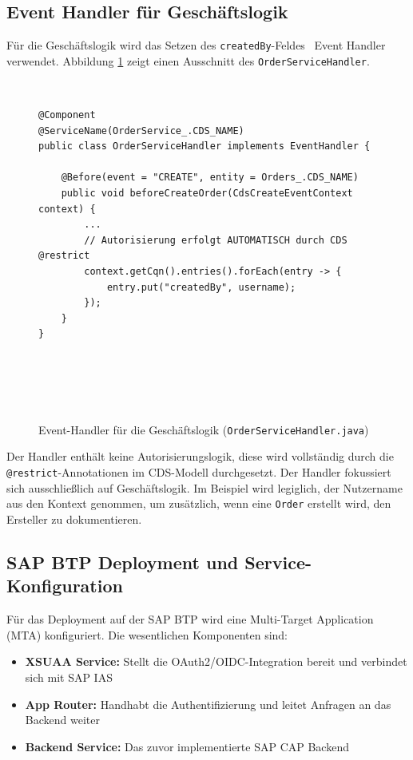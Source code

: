 \subsection{Event Handler für Geschäftslogik}

Für die Geschäftslogik wird das Setzen des \texttt{createdBy}-Feldes  Event Handler verwendet. Abbildung \ref{fig:cap_handler} zeigt einen Ausschnitt des \texttt{OrderServiceHandler}.

\begin{figure}[h]
    \begin{verbatim}
@Component
@ServiceName(OrderService_.CDS_NAME)
public class OrderServiceHandler implements EventHandler {

    @Before(event = "CREATE", entity = Orders_.CDS_NAME)
    public void beforeCreateOrder(CdsCreateEventContext context) {
        ...
        // Autorisierung erfolgt AUTOMATISCH durch CDS @restrict
        context.getCqn().entries().forEach(entry -> {
            entry.put("createdBy", username);
        });
    }
}
    \end{verbatim}
    \caption{Event-Handler für die Geschäftslogik (\texttt{OrderServiceHandler.java})}
    \label{fig:cap_handler}
\end{figure}

Der Handler enthält keine Autorisierungslogik, diese wird vollständig durch die \texttt{@restrict}-Annotationen im \ac{CDS}-Modell durchgesetzt. Der Handler fokussiert sich ausschließlich auf Geschäftslogik. Im Beispiel wird legiglich, der Nutzername aus den Kontext genommen, um zusätzlich, wenn eine \texttt{Order} erstellt wird, den Ersteller zu dokumentieren.

\subsection{SAP BTP Deployment und Service-Konfiguration}

Für das Deployment auf der \ac{SAP BTP} wird eine Multi-Target Application (MTA) konfiguriert. Die wesentlichen Komponenten sind:

\begin{itemize}
    \item \textbf{XSUAA Service:} Stellt die OAuth2/OIDC-Integration bereit und verbindet sich mit \ac{SAP IAS}
    \item \textbf{App Router:} Handhabt die Authentifizierung und leitet Anfragen an das Backend weiter
    \item \textbf{Backend Service:} Das zuvor implementierte \ac{SAP CAP} Backend
\end{itemize}

